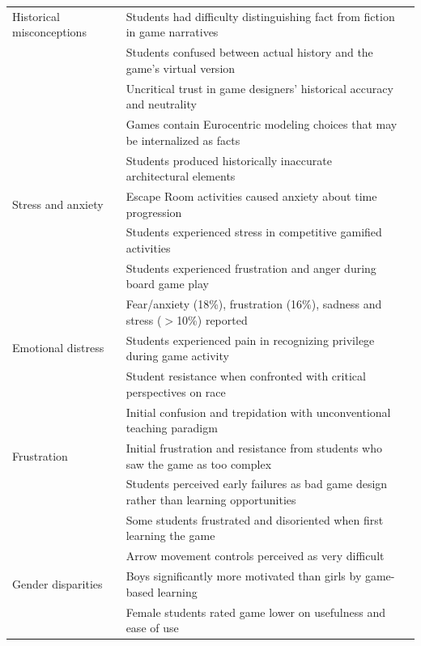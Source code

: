 \documentclass[a4paper,fleqn]{cas-sc}
\begin{document}
\begin{longtable}{|p{}|p{}|l|}
\hline
Historical misconceptions & Students had difficulty distinguishing fact from fiction in game narratives & \citet{71lynch2015pedagogical} \\
 & Students confused between actual history and the game's virtual version & \citet{61Karsenti202027} \\
 & Uncritical trust in game designers' historical accuracy and neutrality & \citet{12Gilbert2019108} \\
 & Games contain Eurocentric modeling choices that may be internalized as facts & \citet{40Kuran2018} \\
 & Students produced historically inaccurate architectural elements & \citet{14Forsyth2023} \\
\hline
Stress and anxiety & Escape Room activities caused anxiety about time progression & \citet{34Serrano2023} \\
 & Students experienced stress in competitive gamified activities & \citet{34Serrano2023} \\
 & Students experienced frustration and anger during board game play & \citet{38Mercik2024} \\
 & Fear/anxiety (18\%), frustration (16\%), sadness and stress ($>$10\%) reported & \citet{38Mercik2024} \\
\hline
Emotional distress & Students experienced pain in recognizing privilege during game activity & \citet{78Rouse2022357} \\
 & Student resistance when confronted with critical perspectives on race & \citet{78Rouse2022357} \\
 & Initial confusion and trepidation with unconventional teaching paradigm & \citet{36Scholz2021} \\
\hline
Frustration & Initial frustration and resistance from students who saw the game as too complex & \citet{55Squire2004} \\
 & Students perceived early failures as bad game design rather than learning opportunities & \citet{55Squire2004} \\
 & Some students frustrated and disoriented when first learning the game & \citet{3Watson2011466} \\
 & Arrow movement controls perceived as very difficult & \citet{22Nugroho2020149} \\
\hline
Gender disparities & Boys significantly more motivated than girls by game-based learning & \citet{8Yu2014} \\
 & Female students rated game lower on usefulness and ease of use & \citet{19Chou2019} \\

\end{longtable}
\end{document}
